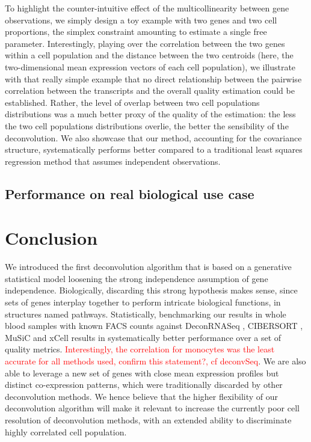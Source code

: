 \documentclass[long, final]{jobim}
\begin{document}
To highlight the counter-intuitive effect of the multicollinearity between gene observations, we simply design a toy example with two genes and two cell proportions, the simplex constraint amounting to estimate a single free parameter. Interestingly, playing over the correlation between the two genes within a cell population and the distance between the two centroids (here, the two-dimensional mean expression vectors of each cell population), we illustrate with that really simple example that no direct relationship between the pairwise correlation between the transcripts and the overall quality estimation could be established. Rather, the level of overlap between two cell populations distributions was a much better proxy of the quality of the estimation: the less the two cell populations distributions overlie, the better the sensibility of the deconvolution. We also showcase that our method, accounting for the covariance structure, systematically performs better compared to a traditional least squares regression method that assumes independent observations.



\subsection{Performance on real biological use case}
\label{subsec:sim-real}



\section{Conclusion}
\label{sec:conclusion}
We introduced the first deconvolution algorithm that is based on a generative statistical model loosening the strong independence assumption of gene independence. Biologically, discarding this strong hypothesis makes sense, since sets of genes interplay together to perform intricate biological functions, in structures named pathways.
Statistically, benchmarking our results in whole blood samples with known FACS counts against DeconRNASeq \cite{gong_szustakowski13}, CIBERSORT \cite{newman_etal15}, MuSiC \cite{wang_etal19} and xCell \cite{aran_etal17} results in systematically better performance over a set of quality metrics. \textcolor{red}{Interestingly, the correlation for monocytes was the least accurate for all methods used, confirm this statement?, cf deconvSeq}. We are also able to leverage a new set of genes with close mean expression profiles but distinct co-expression patterns, which were traditionally discarded by other deconvolution methods. We hence believe that the higher flexibility of our deconvolution algorithm will make it relevant to increase the currently poor cell resolution of deconvolution methods, with an extended ability to discriminate highly correlated cell population.
\end{document}
